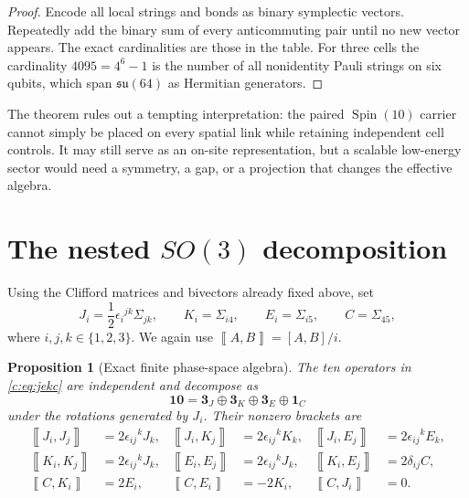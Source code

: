 \documentclass[11pt]{article}
\newtheorem{proposition}[theorem]{Proposition}
\theoremstyle{remark}\newtheorem{remark}[theorem]{Remark}
\newcommand{\Hbr}[2]{\left\llbracket #1,#2\right\rrbracket}
\begin{document}
\begin{proof}
Encode all local strings and bonds as binary symplectic vectors.  Repeatedly add the binary sum of every anticommuting pair until no new vector appears.  The exact cardinalities are those in the table.  For three cells the cardinality $4095=4^6-1$ is the number of all nonidentity Pauli strings on six qubits, which span $\mathfrak{su}(64)$ as Hermitian generators.
\end{proof}

The theorem rules out a tempting interpretation: the paired $\operatorname{Spin}(10)$ carrier cannot simply be placed on every spatial link while retaining independent cell controls.  It may still serve as an on-site representation, but a scalable low-energy sector would need a symmetry, a gap, or a projection that changes the effective algebra.



\section{The nested \texorpdfstring{$SO(3)$}{SO(3)} decomposition}

Using the Clifford matrices and bivectors already fixed above, set
\begin{equation}
J_i=\frac12\epsilon_i{}^{jk}\Sigma_{jk},\qquad
K_i=\Sigma_{i4},\qquad E_i=\Sigma_{i5},\qquad C=\Sigma_{45},
\label{c:eq:jekc}
\end{equation}
where $i,j,k\in\{1,2,3\}$.  We again use $\Hbr{A}{B}=[A,B]/i$.

\begin{proposition}[Exact finite phase-space algebra]\label{c:prop:finite}
The ten operators in \eqref{c:eq:jekc} are independent and decompose as
\begin{equation}
\mathbf{10}=\mathbf3_J\oplus\mathbf3_K\oplus\mathbf3_E\oplus\mathbf1_C
\end{equation}
under the rotations generated by $J_i$.  Their nonzero brackets are
\begin{align}
\Hbr{J_i}{J_j}&=2\epsilon_{ij}{}^kJ_k,&
\Hbr{J_i}{K_j}&=2\epsilon_{ij}{}^kK_k,&
\Hbr{J_i}{E_j}&=2\epsilon_{ij}{}^kE_k,\nonumber\\
\Hbr{K_i}{K_j}&=2\epsilon_{ij}{}^kJ_k,&
\Hbr{E_i}{E_j}&=2\epsilon_{ij}{}^kJ_k,&
\Hbr{K_i}{E_j}&=2\delta_{ij}C,\label{c:eq:brackets}\\
\Hbr{C}{K_i}&=2E_i,&
\Hbr{C}{E_i}&=-2K_i,&
\Hbr{C}{J_i}&=0.\nonumber
\end{align}
\end{proposition}
\end{document}
